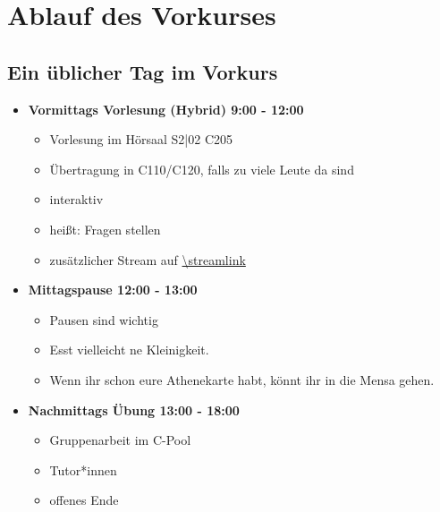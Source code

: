\section{Ablauf des Vorkurses}
\subsection{Ein üblicher Tag im Vorkurs}
\begin{frame}
    \slidehead
    \begin{itemize}
        \item \textbf{Vormittags Vorlesung (Hybrid) 9:00 - 12:00}
            \begin{itemize}
                \item Vorlesung im Hörsaal S2|02 C205
                \item Übertragung in C110/C120, falls zu viele Leute da sind
                \item interaktiv
                \item heißt: Fragen stellen
                \item zusätzlicher Stream auf \url{\streamlink}
            \end{itemize}
            \pause
        \item \textbf{Mittagspause 12:00 - 13:00}
            \begin{itemize}
                \item Pausen sind wichtig
                \item Esst vielleicht ne Kleinigkeit.
                \item Wenn ihr schon eure Athenekarte habt, könnt ihr in die Mensa gehen.
            \end{itemize}
            \pause
        \item \textbf{Nachmittags Übung 13:00 - 18:00}
            \begin{itemize}
                \item Gruppenarbeit im C-Pool
                \item Tutor*innen
                \item offenes Ende
            \end{itemize}
    \end{itemize}
\end{frame}

